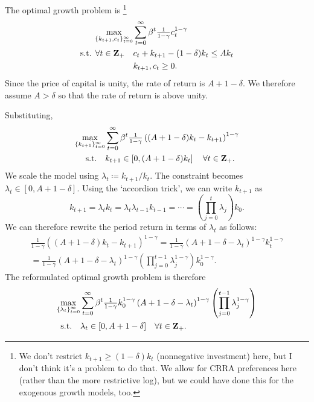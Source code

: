 \documentclass[11pt,letterpaper,reqno,oneside]{article}
\begin{document}
The optimal growth problem is%
		\footnote{We don't restrict $k_{t+1} \geq (1-\delta)k_t$ (nonnegative investment) here, but I don't think it's a problem to do that. We allow for CRRA preferences here (rather than the more restrictive log), but we could have done this for the exogenous growth models, too.}
%
\begin{align*}
	\max_{ \{k_{t+1},c_t\}_{t=0}^\infty }
	&\sum_{t=0}^\infty \beta^t \tfrac{1}{1-\gamma} c_t^{1-\gamma}
	\\
	\text{s.t. $\forall t \in \mathbf{Z}_+$}\quad
	&c_t + k_{t+1} - (1-\delta) k_t \leq A k_t 
	\\
	&k_{t+1}, c_t \geq 0 .
\end{align*}
%
Since the price of capital is unity, the rate of return is $A + 1 - \delta$. We therefore assume $A>\delta$ so that the rate of return is above unity.

Substituting,
%
\begin{align*}
	\max_{ \{k_{t+1}\}_{t=0}^\infty }
	&\sum_{t=0}^\infty \beta^t \tfrac{1}{1-\gamma}
	\left( ( A + 1 - \delta ) k_t - k_{t+1} 
	\right)^{1-\gamma}
	\\
	\text{s.t.}\quad
	&k_{t+1} \in \left[ 0, ( A + 1 - \delta ) k_t \right] 
	\quad\forall t \in \mathbf{Z}_+ .
\end{align*}
%
We scale the model using $\lambda_t \coloneqq k_{t+1}/k_t$. The constraint becomes $\lambda_t \in [ 0, A + 1 - \delta ]$. Using the `accordion trick', we can write $k_{t+1}$ as
%
\begin{equation*}
	k_{t+1} = \lambda_t k_t 
	= \lambda_t \lambda_{t-1} k_{t-1} 
	= \cdots = \left( \prod_{j=0}^t \lambda_j \right) k_0 .
\end{equation*}
%
We can therefore rewrite the period return in terms of $\lambda_t$ as follows:
%
\begin{multline*}
	\tfrac{1}{1-\gamma}
	\left( ( A + 1 - \delta ) k_t - k_{t+1} 
	\right)^{1-\gamma}
	=
	\tfrac{1}{1-\gamma} 
	\left( A + 1-\delta - \lambda_t 
	\right)^{1-\gamma}
	k_t^{1-\gamma}
	\\
	=
	\tfrac{1}{1-\gamma} 
	\left( A + 1-\delta - \lambda_t 
	\right)^{1-\gamma}
	\left( \prod_{j=0}^{t-1} \lambda_j^{1-\gamma} \right) 
	k_0^{1-\gamma} .
\end{multline*}
%
The reformulated optimal growth problem is therefore
%
\begin{align*}
	\max_{ \{\lambda_t\}_{t=0}^\infty }
	&\sum_{t=0}^\infty \beta^t 
	\tfrac{1}{1-\gamma} 
	k_0^{1-\gamma} 
	\left( A + 1-\delta - \lambda_t 
	\right)^{1-\gamma}
	\left( \prod_{j=0}^{t-1} \lambda_j^{1-\gamma} \right) 
	\\
	\text{s.t.}\quad
	&\lambda_t \in [ 0, A + 1 - \delta ] 
	\quad\forall t \in \mathbf{Z}_+ .
\end{align*}
\end{document}

